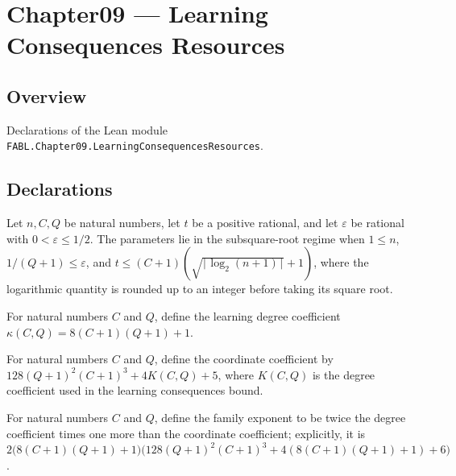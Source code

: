 \chapter{Chapter09 — Learning Consequences Resources}
\section{Overview}

Declarations of the Lean module \texttt{FABL.Chapter09.LearningConsequencesResources}.

\section{Declarations}

\begin{definition}
\label{FABL.LearningConsequencesSubsqrtRegime}
\leanok
{}
Let $n,C,Q$ be natural numbers, let $t$ be a positive rational, and let $\varepsilon$ be
rational with $0<\varepsilon\le 1/2$. The parameters lie in the subsquare-root regime
when $1\le n$, $1/(Q+1)\le\varepsilon$, and $t\le
(C+1)(\sqrt{\lceil\log_2(n+1)\rceil}+1)$, where the logarithmic quantity is rounded up
to an integer before taking its square root.
\end{definition}

\begin{definition}
\label{FABL.learningConsequencesDegreeCoefficient}
\leanok
For natural numbers $C$ and $Q$, define the learning degree coefficient
$\kappa(C,Q)=8(C+1)(Q+1)+1$.
\end{definition}

\begin{definition}
\label{FABL.learningConsequencesCoordinateCoefficient}
\leanok
{}
For natural numbers $C$ and $Q$, define the coordinate coefficient by $128(Q+1)^2(C+1)^3
+ 4K(C,Q) + 5$, where $K(C,Q)$ is the degree coefficient used in the learning
consequences bound.
\end{definition}

\begin{definition}
\label{FABL.learningConsequencesFamilyExponent}
\leanok
{}
For natural numbers $C$ and $Q$, define the family exponent to be twice the degree
coefficient times one more than the coordinate coefficient; explicitly, it is
$2\bigl(8(C+1)(Q+1)+1\bigr)\bigl(128(Q+1)^2(C+1)^3+4(8(C+1)(Q+1)+1)+6\bigr)$.
\end{definition}

